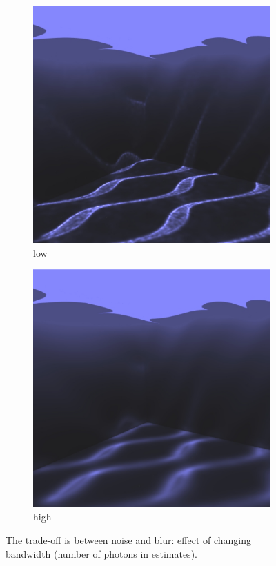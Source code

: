\begin{figure}
\begin{center}
	\begin{subfigure}[b]{.48\textwidth}
		\includegraphics[width=1.\textwidth]{graphics/pm/pm-12-3}
		\caption{low}
	\end{subfigure}
	\begin{subfigure}[b]{.48\textwidth}
		\includegraphics[width=1.\textwidth]{graphics/pm/pm-12-4}
		\caption{high}
	\end{subfigure}
\end{center}
\caption{The trade-off is between noise and blur: effect of changing bandwidth (number of photons in estimates).}
\label{f:trade-off-bias-and-blur}
\end{figure}

